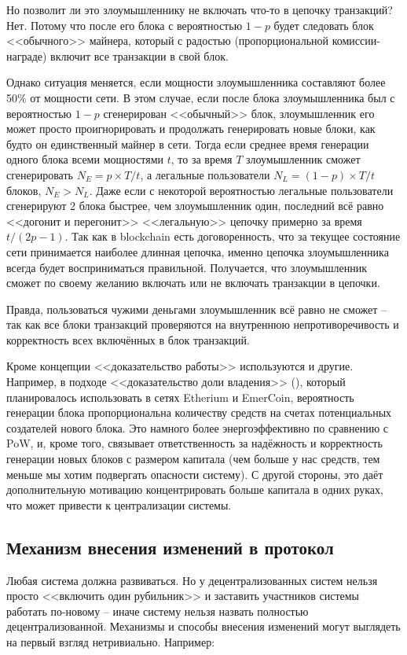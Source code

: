 Но позволит ли это злоумышленнику не включать что-то в цепочку транзакций? Нет. Потому что после его блока с вероятностью $1 - p$ будет следовать блок <<обычного>> майнера, который с радостью (пропорциональной комиссии-награде) включит все транзакции в свой блок.

Однако ситуация меняется, если мощности злоумышленника составляют более 50\% от мощности сети. В этом случае, если после блока злоумышленника был с вероятностью $1 - p$ сгенерирован <<обычный>> блок, злоумышленник его может просто проигнорировать и продолжать генерировать новые блоки, как будто он единственный майнер в сети. Тогда если среднее время генерации одного блока всеми мощностями $t$, то за время $T$ злоумышленник сможет сгенерировать $N_E = p \times T / t$, а легальные пользователи $N_L = (1 - p) \times T / t$ блоков, $N_E > N_L$. Даже если с некоторой вероятностью легальные пользователи сгенерируют 2 блока быстрее, чем злоумышленник один, последний всё равно <<догонит и перегонит>> <<легальную>> цепочку примерно за время $t / (2p - 1)$. Так как в blockchain есть договоренность, что за текущее состояние сети принимается наиболее длинная цепочка, именно цепочка злоумышленника всегда будет восприниматься правильной. Получается, что злоумышленник сможет по своему желанию включать или не включать транзакции в цепочки.

Правда, пользоваться чужими деньгами злоумышленник всё равно не сможет -- так как все блоки транзакций проверяются на внутреннюю непротиворечивость и корректность всех включённых в блок транзакций.

Кроме концепции <<доказательство работы>> используются и другие. Например, в подходе <<доказательство доли владения>> (), который планировалось использовать в сетях Etherium и EmerCoin, вероятность генерации блока пропорциональна количеству средств на счетах потенциальных создателей нового блока. Это намного более энергоэффективно по сравнению с PoW, и, кроме того, связывает ответственность за надёжность и корректность генерации новых блоков с размером капитала (чем больше у нас средств, тем меньше мы хотим подвергать опасности систему). С другой стороны, это даёт дополнительную мотивацию концентрировать больше капитала в одних руках, что может привести к централизации системы.

\subsection{Механизм внесения изменений в протокол}
Любая система должна развиваться. Но у децентрализованных систем нельзя просто <<включить один рубильник>> и заставить участников системы работать по-новому -- иначе систему нельзя назвать полностью децентрализованной. Механизмы и способы внесения изменений могут выглядеть на первый взгляд нетривиально. Например:

